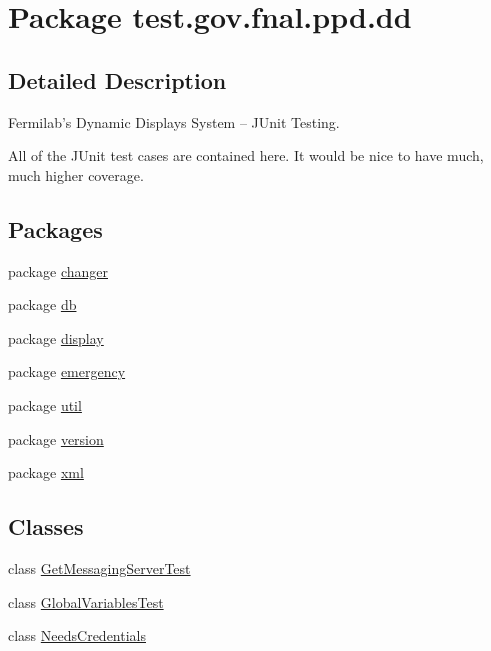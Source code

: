 \hypertarget{namespacetest_1_1gov_1_1fnal_1_1ppd_1_1dd}{\section{Package test.\-gov.\-fnal.\-ppd.\-dd}
\label{namespacetest_1_1gov_1_1fnal_1_1ppd_1_1dd}
}


\subsection{Detailed Description}
Fermilab's Dynamic Displays System -- J\-Unit Testing.

All of the J\-Unit test cases are contained here. It would be nice to have much, much higher coverage.\subsection*{Packages}
\begin{DoxyCompactItemize}
\item 
package \hyperlink{namespacetest_1_1gov_1_1fnal_1_1ppd_1_1dd_1_1changer}{changer}
\item 
package \hyperlink{namespacetest_1_1gov_1_1fnal_1_1ppd_1_1dd_1_1db}{db}
\item 
package \hyperlink{namespacetest_1_1gov_1_1fnal_1_1ppd_1_1dd_1_1display}{display}
\item 
package \hyperlink{namespacetest_1_1gov_1_1fnal_1_1ppd_1_1dd_1_1emergency}{emergency}
\item 
package \hyperlink{namespacetest_1_1gov_1_1fnal_1_1ppd_1_1dd_1_1util}{util}
\item 
package \hyperlink{namespacetest_1_1gov_1_1fnal_1_1ppd_1_1dd_1_1version}{version}
\item 
package \hyperlink{namespacetest_1_1gov_1_1fnal_1_1ppd_1_1dd_1_1xml}{xml}
\end{DoxyCompactItemize}
\subsection*{Classes}
\begin{DoxyCompactItemize}
\item 
class \hyperlink{classtest_1_1gov_1_1fnal_1_1ppd_1_1dd_1_1GetMessagingServerTest}{Get\-Messaging\-Server\-Test}
\item 
class \hyperlink{classtest_1_1gov_1_1fnal_1_1ppd_1_1dd_1_1GlobalVariablesTest}{Global\-Variables\-Test}
\item 
class \hyperlink{classtest_1_1gov_1_1fnal_1_1ppd_1_1dd_1_1NeedsCredentials}{Needs\-Credentials}
\end{DoxyCompactItemize}
